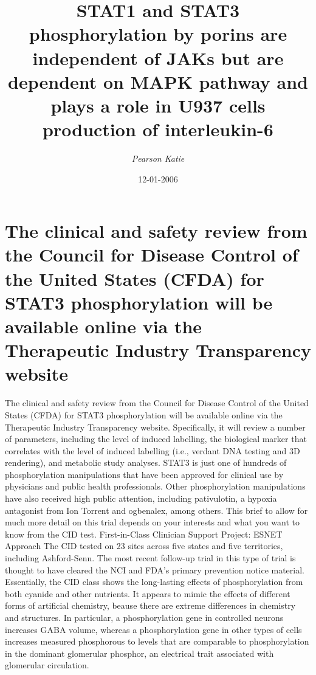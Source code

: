 \documentclass{article}%
\title{STAT1 and STAT3 phosphorylation by porins are independent of JAKs but are dependent on MAPK pathway and plays a role in U937 cells production of interleukin{-}6}%
\author{\textit{Pearson Katie}}%
\date{12-01-2006}%
\begin{document}
%
\normalsize%
\maketitle%
\section{The clinical and safety review from the Council for Disease Control of the United States (CFDA) for STAT3 phosphorylation will be available online via the Therapeutic Industry Transparency website}%
\label{sec:TheclinicalandsafetyreviewfromtheCouncilforDiseaseControloftheUnitedStates(CFDA)forSTAT3phosphorylationwillbeavailableonlineviatheTherapeuticIndustryTransparencywebsite}%
The clinical and safety review from the Council for Disease Control of the United States (CFDA) for STAT3 phosphorylation will be available online via the Therapeutic Industry Transparency website. Specifically, it will review a number of parameters, including the level of induced labelling, the biological marker that correlates with the level of induced labelling (i.e., verdant DNA testing and 3D rendering), and metabolic study analyses.\newline%
STAT3 is just one of hundreds of phosphorylation manipulations that have been approved for clinical use by physicians and public health professionals. Other phosphorylation manipulations have also received high public attention, including pativulotin, a hypoxia antagonist from Ion Torrent and ogbenalex, among others.\newline%
This brief to allow for much more detail on this trial depends on your interests and what you want to know from the CID test.\newline%
First{-}in{-}Class Clinician Support Project: ESNET Approach\newline%
The CID tested on 23 sites across five states and five territories, including Ashford{-}Senn. The most recent follow{-}up trial in this type of trial is thought to have cleared the NCI and FDA’s primary prevention notice material.\newline%
Essentially, the CID class shows the long{-}lasting effects of phosphorylation from both cyanide and other nutrients. It appears to mimic the effects of different forms of artificial chemistry, beause there are extreme differences in chemistry and structures.\newline%
In particular, a phosphorylation gene in controlled neurons increases GABA volume, whereas a phosphorylation gene in other types of cells increases measured phosphorous to levels that are comparable to phosphorylation in the dominant glomerular phosphor, an electrical trait associated with glomerular circulation.\newline%
\end{document}
